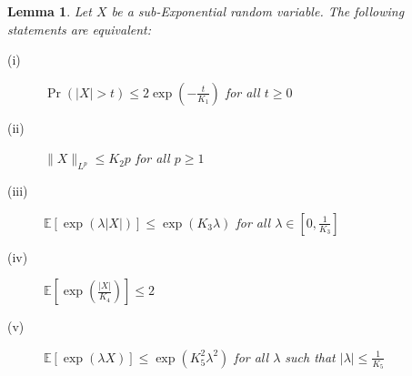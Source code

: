 \documentclass{article}
\newtheorem{lemma}{Lemma}[subsection]
\theoremstyle{remark}
\newcommand{\Exp}{\mathbb{E}}
\begin{document}
\begin{lemma}
Let \(X\) be a sub-Exponential random variable. The following statements are equivalent:
\begin{description}
\item [(i)] \(\Pr(|X| > t) \leq 2\exp\left(-\frac{t}{K_{1}}\right)\) for all \(t \geq 0\)
\item [(ii)] \(\|X\|_{L^{p}} \leq K_{2}p\) for all \(p \geq 1\)
\item [(iii)] \(\Exp[\exp(\lambda|X|)] \leq \exp(K_{3}\lambda)\) for all \(\lambda \in \left[0, \frac{1}{K_{3}}\right]\)
\item [(iv)] \(\Exp\left[\exp\left(\frac{|X|}{K_{4}}\right)\right] \leq 2\)
\item [(v)] \(\Exp[\exp(\lambda X)] \leq \exp(K_{5}^{2}\lambda^{2})\) for all \(\lambda\) such that \(|\lambda| \leq \frac{1}{K_{5}}\)
\end{description}
\end{lemma}

\newpage


\end{document}
